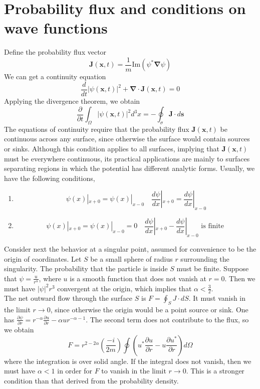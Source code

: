 \section{Probability flux and conditions on wave functions}
\noindent
Define the probability flux vector
\[\bm{J}(\bm{x},t) = \frac{1}{m} \mathrm{Im}(\psi^*\bm{\nabla}\psi)\]
We can get a continuity equation
\[\frac{d}{dt} |\psi(\bm{x},t)|^2 + \bm{\nabla} \cdot \bm{J}(\bm{x},t) = 0\]
Applying the divergence theorem, we obtain
\[\frac{\partial}{\partial t} \int_{\Omega} |\psi(\bm{x},t)|^2 d^3x = - \oint_{\sigma} \bm{J} \cdot d\bm{s}\]
The equations of continuity require that the probability
flux $\bm{J}(\bm{x},t)$ be continuous across any surface, since otherwise the surface would contain sources or sinks. Although this condition applies to all surfaces, implying that $\bm{J}(\bm{x},t)$ must be everywhere continuous, its practical applications are mainly to surfaces separating regions in which the potential has different analytic forms.
Usually, we have the following conditions,
\begin{enumerate}
\item \[\psi(x)|_{x+0} = \psi(x)|_{x-0} \quad \frac{d\psi}{dx}|_{x+0} = \frac{d\psi}{dx}|_{x-0}\]
\item \[\psi(x)|_{x+0} = \psi(x)|_{x-0} = 0 \quad \frac{d\psi}{dx}|_{x+0} - \frac{d\psi}{dx}|_{x-0} \mbox{ is finite }\]
\end{enumerate}
\noindent
Consider next the behavior at a singular point, assumed for convenience to be the origin of coordinates. Let $S$ be a small sphere of radius $r$ surrounding the singularity. The probability that the particle is inside $S$ must be finite.
Suppose that $\psi = \frac{u}{r^{\alpha}}$, where $u$ is a smooth function that does not vanish at $r=0$. Then we must have $|\psi|^2 r^3$ convergent at the origin, which implies that $\alpha < \frac{3}{2}$.\\
The net outward flow through the surface $S$ is $F = \oint_{S} J \cdot dS$. It must vanish in the limit $r \to 0$, since otherwise the origin would be a point source or sink.
One has $\frac{\partial \psi}{\partial r} = r^{-\alpha} \frac{\partial u}{\partial r} - \alpha u r^{-\alpha-1}$. The second term does not contribute to the flux, so we obtain
\[F = r^{2-2\alpha} \left( \frac{-i}{2m} \right) \oint \left( u^* \frac{\partial u}{\partial r} - u\frac{\partial u^*}{\partial r} \right) d\Omega\]
where the integration is over solid angle. If the integral does not vanish, then we must have $\alpha <1$ in order for $F$ to vanish in the limit $r \to 0$. This is a stronger condition than that derived from the probability density. \\

